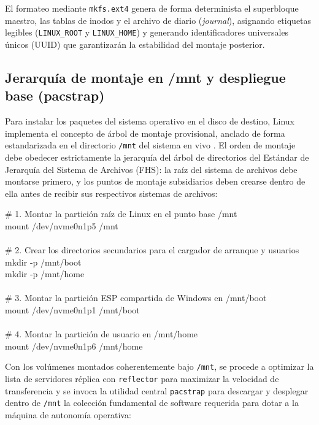 \documentclass[12pt]{article}
\begin{document}
El formateo mediante \texttt{mkfs.ext4} genera de forma determinista el superbloque maestro, las tablas de inodos y el archivo de diario (\textit{journal}), asignando etiquetas legibles (\texttt{LINUX\_ROOT} y \texttt{LINUX\_HOME}) y generando identificadores universales únicos (UUID) que garantizarán la estabilidad del montaje posterior.

\subsection{Jerarquía de montaje en /mnt y despliegue base (pacstrap)}
\label{sec:jerarquiaMontajePacstrap}

Para instalar los paquetes del sistema operativo en el disco de destino, Linux implementa el concepto de árbol de montaje provisional, anclado de forma estandarizada en el directorio \texttt{/mnt} del sistema en vivo \parencite[\S 12.1, p.\ 409]{silberschatz2006fundamentos}. El orden de montaje debe obedecer estrictamente la jerarquía del árbol de directorios del Estándar de Jerarquía del Sistema de Archivos (FHS): la raíz del sistema de archivos debe montarse primero, y los puntos de montaje subsidiarios deben crearse dentro de ella antes de recibir sus respectivos sistemas de archivos:

\begin{mdframed}[style=terminal]
\ttfamily\upshape\color{bashLetterColor}\footnotesize
\# 1. Montar la partición raíz de Linux en el punto base /mnt \\
mount /dev/nvme0n1p5 /mnt \\
\\
\# 2. Crear los directorios secundarios para el cargador de arranque y usuarios \\
mkdir -p /mnt/boot \\
mkdir -p /mnt/home \\
\\
\# 3. Montar la partición ESP compartida de Windows en /mnt/boot \\
mount /dev/nvme0n1p1 /mnt/boot \\
\\
\# 4. Montar la partición de usuario en /mnt/home \\
mount /dev/nvme0n1p6 /mnt/home
\end{mdframed}

Con los volúmenes montados coherentemente bajo \texttt{/mnt}, se procede a optimizar la lista de servidores réplica con \texttt{reflector} para maximizar la velocidad de transferencia y se invoca la utilidad central \texttt{pacstrap} para descargar y desplegar dentro de \texttt{/mnt} la colección fundamental de software requerida para dotar a la máquina de autonomía operativa:
\end{document}
